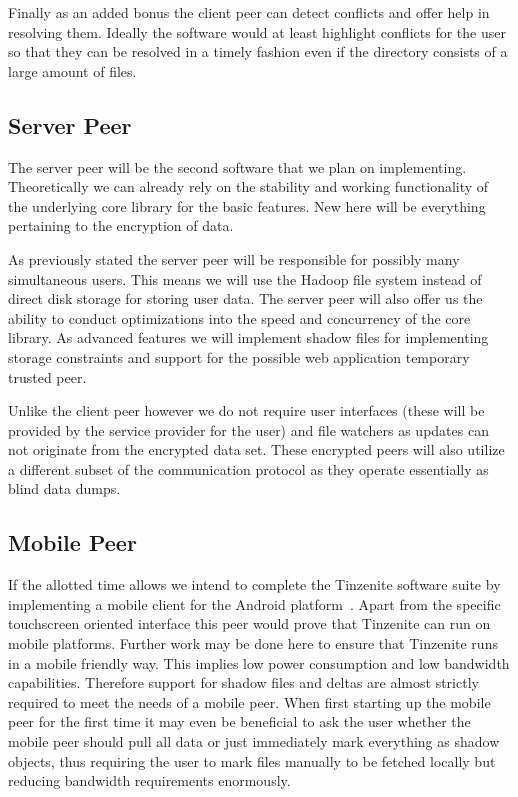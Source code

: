 Finally as an added bonus the client peer can detect conflicts and offer help in resolving them.
Ideally the software would at least highlight conflicts for the user so that they can be resolved in a timely fashion even if the directory consists of a large amount of files.

\subsection{Server Peer}

The server peer will be the second software that we plan on implementing.
Theoretically we can already rely on the stability and working functionality of the underlying core library for the basic features.
New here will be everything pertaining to the encryption of data.

As previously stated the server peer will be responsible for possibly many simultaneous users.
This means we will use the Hadoop file system instead of direct disk storage for storing user data.
The server peer will also offer us the ability to conduct optimizations into the speed and concurrency of the core library.
As advanced features we will implement shadow files for implementing storage constraints and support for the possible web application temporary trusted peer.

Unlike the client peer however we do not require user interfaces (these will be provided by the service provider for the user) and file watchers as updates can not originate from the encrypted data set.
These encrypted peers will also utilize a different subset of the communication protocol as they operate essentially as blind data dumps.

\subsection{Mobile Peer}

If the allotted time allows we intend to complete the Tinzenite software suite by implementing a mobile client for the Android platform~\cite{web:site:android}.
Apart from the specific touchscreen oriented interface this peer would prove that Tinzenite can run on mobile platforms.
Further work may be done here to ensure that Tinzenite runs in a mobile friendly way.
This implies low power consumption and low bandwidth capabilities.
Therefore support for shadow files and deltas are almost strictly required to meet the needs of a mobile peer.
When first starting up the mobile peer for the first time it may even be beneficial to ask the user whether the mobile peer should pull all data or just immediately mark everything as shadow objects, thus requiring the user to mark files manually to be fetched locally but reducing bandwidth requirements enormously.

